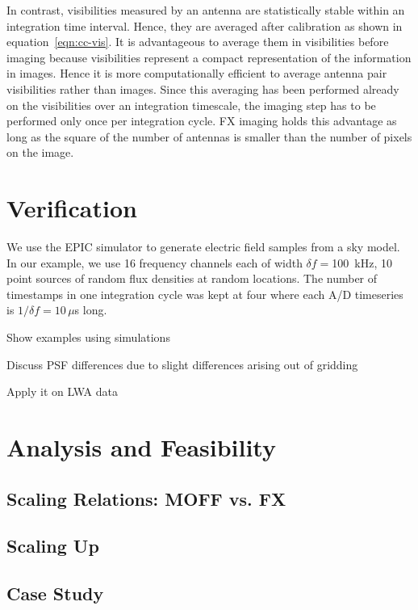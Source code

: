 \documentclass[a4paper,fleqn,usenatbib]{../mnras}
\begin{document}
In contrast, visibilities measured by an antenna are statistically stable within an integration time interval. Hence, they are averaged after calibration as shown in equation~\ref{eqn:cc-vis}. It is advantageous to average them in visibilities before imaging because visibilities represent a compact representation of the information in images. Hence it is more computationally efficient to average antenna pair visibilities rather than images. Since this averaging has been performed already on the visibilities over an integration timescale, the imaging step has to be performed only once per integration cycle. FX imaging holds this advantage as long as the square of the number of antennas is smaller than the number of pixels on the image. 

\section{Verification}\label{sec:verify}

We use the EPIC simulator to generate electric field samples from a sky model. In our example, we use 16 frequency channels each of width $\delta f=$100~kHz, 10 point sources of random flux densities at random locations. The number of timestamps in one integration cycle was kept at four where each A/D timeseries is $1/\delta f=10\,\mu$s long. 

Show examples using simulations

Discuss PSF differences due to slight differences arising out of gridding

Apply it on LWA data

\section{Analysis and Feasibility}\label{sec:analysis}

\subsection{Scaling Relations: MOFF vs. FX}
\subsection{Scaling Up}
\subsection{Case Study}
\end{document}
